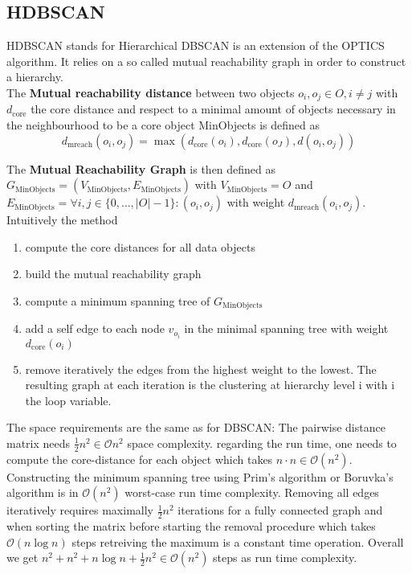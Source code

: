 \subsection{HDBSCAN}\label{\positionnumber}
HDBSCAN\cite{hdbscan} stands for Hierarchical DBSCAN is an extension of the OPTICS algorithm. It relies on a so called mutual reachability graph in order to construct a hierarchy.\\

The \textbf{Mutual reachability distance} between two objects $o_i, o_j \in O, i \neq j$ with $d_{\text{core}}$ the core distance and respect to a minimal amount of objects necessary in the neighbourhood to be a core object MinObjects is defined as \[ d_{\text{mreach}}(o_i, o_j) = \max(d_{\text{core}}(o_i), d_{\text{core}}(o_J), d(o_i, o_j)) \]

The \textbf{Mutual Reachability Graph} is then defined as $G_{\text{MinObjects}} = (V_{\text{MinObjects}}, E_{\text{MinObjects}})$ with $V_{\text{MinObjects}} = O$ and $E_{\text{MinObjects}} = \forall i, j \in \{0, \dots, |O| - 1\}: (o_i, o_j) $ with weight $d_{\text{mreach}}(o_i, o_j)$.\\

Intuitively the method
\begin{enumerate}
\item compute the core distances for all data objects
    \item build the mutual reachability graph
    \item compute a minimum spanning tree of $G_{\text{MinObjects}}$
    \item add a self edge to each node $v_{o_i}$ in the minimal spanning tree with weight $d_{\text{core}}(o_i)$
    \item remove iteratively the edges from the highest weight to the lowest. The resulting graph at each iteration is the clustering at hierarchy level i with i the loop variable.
\end{enumerate}

The space requirements are the same as for DBSCAN: The pairwise distance matrix needs $\frac{1}{2}n^2 \in \mathcal{O}n^2$ space complexity. regarding the run time, one needs to compute the core-distance for each object which takes $n \cdot n \in \mathcal{O}(n^2)$. Constructing the minimum spanning tree using Prim's algorithm or Boruvka's algorithm is in $\mathcal{O}(n^2)$ worst-case run time complexity. Removing all edges iteratively requires maximally $\frac{1}{2}n^2$ iterations for a fully connected graph and when sorting the matrix before starting the removal procedure which takes $\mathcal{O}(n \log n)$ steps retreiving the maximum is a constant time operation. Overall we get $n^2 + n^2 + n \log n +\frac{1}{2}n^2 \in \mathcal{O}(n^2)$ steps as run time complexity.



